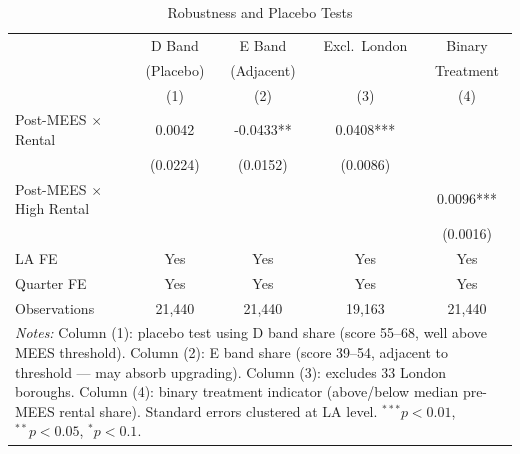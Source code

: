 \begin{table}[t]
\centering
\caption{Robustness and Placebo Tests}
\label{tab:robust}
\small
\begin{tabular}{lcccc}
\hline\hline
 & D Band & E Band & Excl.\ London & Binary \\
 & (Placebo) & (Adjacent) & & Treatment \\
 & (1) & (2) & (3) & (4) \\
\hline
Post-MEES $\times$ Rental & 0.0042 & -0.0433** & 0.0408*** & \\
 & (0.0224) & (0.0152) & (0.0086) & \\
Post-MEES $\times$ High Rental & & & & 0.0096*** \\
 & & & & (0.0016) \\
\hline
LA FE & Yes & Yes & Yes & Yes \\
Quarter FE & Yes & Yes & Yes & Yes \\
Observations & 21,440 & 21,440 & 19,163 & 21,440 \\
\hline\hline
\multicolumn{5}{p{0.95\textwidth}}{\scriptsize \textit{Notes:}  Column (1): placebo test using D band share (score 55--68, well above MEES threshold).  Column (2): E band share (score 39--54, adjacent to threshold --- may absorb upgrading).  Column (3): excludes 33 London boroughs. Column (4): binary treatment indicator  (above/below median pre-MEES rental share). Standard errors clustered at LA level.  $^{***}p<0.01$, $^{**}p<0.05$, $^{*}p<0.1$.}
\end{tabular}
\end{table}
